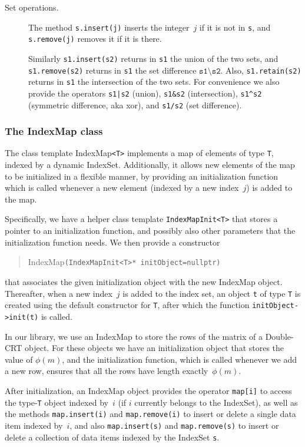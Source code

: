 \documentclass[14pt]{extarticle}
\def\IndexSet{\textsf{IndexSet}}
\def\IndexMap{\textsf{IndexMap}}
\begin{document}
\begin{description}
\item[Set operations.] 
The method \texttt{s.insert(j)} inserts the integer~$j$ if it is not
in \texttt{s}, and \texttt{s.remove(j)} removes it if it is there.

Similarly \texttt{s1.insert(s2)} returns in \texttt{s1} the union of
the two sets, and \texttt{s1.remove(s2)} returns in \texttt{s1} the
set difference $\mathtt{s1\setminus s2}$. Also, \texttt{s1.retain(s2)}
returns in \texttt{s1} the intersection of the two sets.
For convenience we also provide the operators \texttt{s1|s2} (union),
\texttt{s1\&s2} (intersection), \texttt{s1}\texttt{\^}\texttt{s2}
(symmetric difference, aka xor), and \texttt{s1/s2} (set difference). 
\end{description}

\subsubsection{The {\IndexMap} class}
The class template {\IndexMap}\texttt{<T>} implements a map of elements
of type \texttt{T}, indexed by a dynamic {\IndexSet}.  Additionally, it
allows new elements of the map to be initialized in a flexible manner,
by providing an initialization function which is called whenever a new
element (indexed by a new index~$j$) is added to the map. 

Specifically, we have a helper class template \texttt{IndexMapInit<T>}
that stores a pointer to an initialization function, and possibly also
other parameters that the initialization function needs. We 
then provide a constructor 
\begin{quote}
{\IndexMap}\texttt{(IndexMapInit<T>*
initObject=nullptr)} 
\end{quote}
that associates the given initialization object
with the new {\IndexMap} object.
Thereafter, when a new index~$j$ is added to the index set, an object
\texttt{t} of type \texttt{T} is created using the default constructor
for \texttt{T}, after which the function \texttt{initObject->init(t)}
is called.

In our library, we use an {\IndexMap} to store the rows of the matrix
of a Double-CRT object. For these objects we have an initialization
object that stores the value of $\phi(m)$, and the initialization
function, which is called whenever we add a new row, ensures that all
the rows have length exactly~$\phi(m)$.

After initialization, an {\IndexMap} object provides the operator
\texttt{map[i]} to access the type-\texttt{T} object indexed by~$i$
(if $i$ currently belongs to the {\IndexSet}), as well as the methods
\texttt{map.insert(i)} and \texttt{map.remove(i)} to insert or delete
a single data item indexed by~$i$, and also \texttt{map.insert(s)} and
\texttt{map.remove(s)}  to insert or delete a collection of data items
indexed by the {\IndexSet} \texttt{s}.
\end{document}
